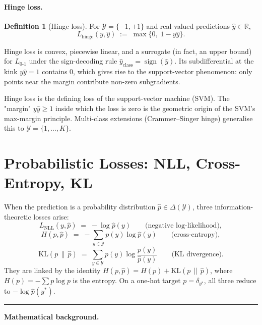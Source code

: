 \documentclass[11pt]{article}
\theoremstyle{definition}
\newtheorem{definition}{Definition}
\begin{document}
\paragraph{Hinge loss.}

\begin{definition}[Hinge loss]
For $\mathcal{Y} = \{-1, +1\}$ and real-valued predictions
$\hat y \in \mathbb{R}$,
\[
  L_{\mathrm{hinge}}(y, \hat y) \;:=\; \max\{0,\; 1 - y \hat y\}.
\]
\end{definition}

\begin{mathnote}
Hinge loss is convex, piecewise linear, and a surrogate (in fact, an upper
bound) for $L_{0\text{-}1}$ under the sign-decoding rule $\hat{y}_{\text{class}} =
\operatorname{sign}(\hat y)$. Its subdifferential at the kink $y \hat y = 1$
contains $0$, which gives rise to the support-vector phenomenon: only points
near the margin contribute non-zero subgradients.
\end{mathnote}

\begin{mlnote}
Hinge loss is the defining loss of the support-vector machine (SVM). The
"margin" $y \hat y \geq 1$ inside which the loss is zero is the geometric
origin of the SVM's max-margin principle. Multi-class extensions
(Crammer--Singer hinge) generalise this to $\mathcal{Y} = \{1, \dots, K\}$.
\end{mlnote}

\section{Probabilistic Losses: NLL, Cross-Entropy, KL}

When the prediction is a probability distribution
$\hat p \in \Delta(\mathcal{Y})$, three information-theoretic losses arise:
\[
  L_{\mathrm{NLL}}(y, \hat p) \;=\; -\log \hat p(y)
  \qquad \text{(negative log-likelihood)},
\]
\[
  H(p, \hat p) \;=\; -\sum_{y \in \mathcal{Y}} p(y) \log \hat p(y)
  \qquad \text{(cross-entropy)},
\]
\[
  \mathrm{KL}(p \,\|\, \hat p)
  \;=\; \sum_{y \in \mathcal{Y}} p(y) \log \frac{p(y)}{\hat p(y)}
  \qquad \text{(KL divergence)}.
\]
They are linked by the identity
$H(p, \hat p) = H(p) + \mathrm{KL}(p \,\|\, \hat p)$, where $H(p) = -\sum p \log p$
is the entropy. On a one-hot target $p = \delta_{y^{\ast}}$, all three
reduce to $-\log \hat p(y^{\ast})$.

\bigskip
\hrule
\bigskip

\noindent\textbf{Mathematical background.}
\end{document}
